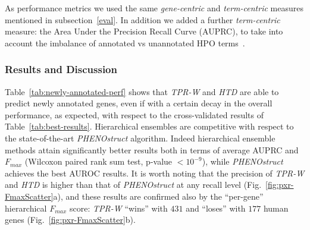 \documentclass{bioinfo}
\begin{document}

As performance metrics we used the same {\it gene-centric} and {\it term-centric} measures mentioned in subsection~\ref{eval}. In addition we added a further {\it term-centric} measure: the Area Under the Precision Recall Curve (AUPRC), to take into account the imbalance of annotated vs unannotated HPO terms~\citep{Saito15}.
 
\subsubsection{Results and Discussion}
\label{res2}
Table~\ref{tab:newly-annotated-perf} shows that \textsl{TPR-W} and \textsl{HTD}  are able to predict newly annotated genes, even if with a certain decay in the overall performance, as expected, with respect to the cross-validated results of Table~\ref{tab:best-results}. 
Hierarchical ensembles are competitive with respect to the state-of-the-art \textsl{PHENOstruct} algorithm.
Indeed hierarchical ensemble methods attain significantly better results both in terms of average AUPRC and $F_{max}$  (Wilcoxon paired rank sum test, p-value $< 10^{-9}$), while \textsl{PHENOstruct} achieves the best AUROC results. It is worth noting that the precision of \textsl{TPR-W} and \textsl{HTD} is higher than that of \textsl{PHENOstruct} at any recall level (Fig.~\ref{fig:pxr-FmaxScatter}a), and these results are confirmed also by the ``per-gene'' hierarchical $F_{max}$ score: {\em TPR-W} ``wins'' with $431$  and ``loses'' with $177$ human genes (Fig.~\ref{fig:pxr-FmaxScatter}b).
\end{document}
